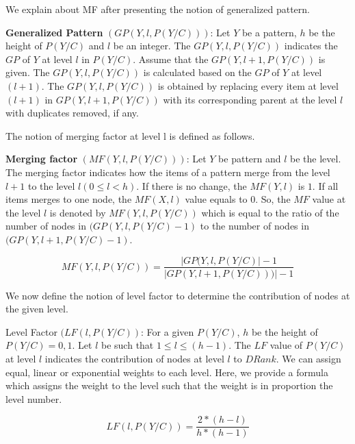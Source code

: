 We explain about MF after presenting the notion of generalized pattern.

\textbf{Generalized Pattern} $(GP (Y, l, P (Y /C)))$: Let $Y$ be a pattern, $h$ be the height of $P (Y /C)$ and $l$ be an integer.
The $GP (Y, l, P (Y /C))$ indicates the $GP$ of $Y$ at level  $l$ in $P (Y /C)$. 
Assume that the $GP (Y, l + 1, P (Y /C))$ is given. 
The $GP (Y, l, P (Y /C))$ is calculated based on the $GP$ of $Y$ at level $(l + 1)$. 
The $GP (Y, l, P (Y /C))$ is obtained by replacing every item at level $(l + 1)$ in $GP (Y, l + 1, P (Y /C))$ with its corresponding parent at the level $l$ with duplicates removed, if any.

The notion of merging factor at level l is defined as follows.

\textbf{Merging factor} $(MF (Y, l, P (Y /C)))$: Let $Y$ be pattern and $l$ be the level. The merging factor indicates how the items of a
pattern merge from the level $l + 1$ to the level $l (0 ≤ l < h)$.
If there is no change, the $MF(Y,l)$ is $1$. 
If all items merges to one node, the $MF(X,l)$ value equals to $0$.
So, the $MF$ value at the level $l$ is denoted by $MF(Y, l, P (Y /C))$ which is equal
to the ratio of the number of nodes in $(GP (Y, l, P (Y /C) − 1)$ to the number of nodes in $(GP (Y, l + 1, P (Y /C) − 1)$.

\begin{equation}
    MF(Y,l,P(Y/C)) = \frac{|GP(Y,l,P(Y/C)| - 1}{|GP(Y,l+1,P(Y/C)))|-1}
\end{equation}

We now define the notion of level factor to determine the contribution of nodes at the given level.

Level Factor $(LF (l, P (Y /C))$: For a given $P (Y /C)$, $h$ be the height of $P (Y /C) = {0, 1}$. 
Let $l$ be such that $1 ≤ l ≤ (h − 1)$.
The $LF$ value of $P (Y /C)$ at level $l$ indicates the contribution of nodes at level $l$ to $DRank$.
We can assign equal, linear or exponential weights to each level. 
Here, we provide a formula which assigns the weight to the level such that the weight is in proportion the level number.

\begin{equation}
LF (l, P (Y /C))=\frac{2 * (h - l)}{ h * (h - 1)}
\end{equation}

